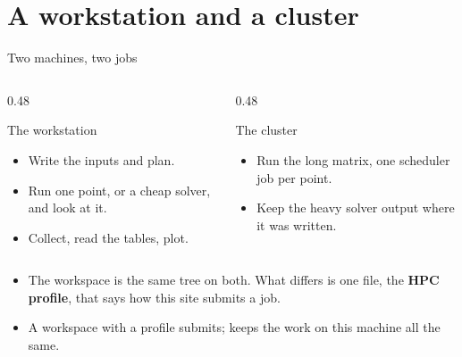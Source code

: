 %
%

\section{A workstation and a cluster}

\begin{frame}{Two machines, two jobs}
\begin{columns}[T]
\begin{column}{0.48\textwidth}
\begin{block}{The workstation}
\begin{itemize}\small
  \item Write the inputs and plan.
  \item Run one point, or a cheap solver, and look at it.
  \item Collect, read the tables, plot.
\end{itemize}
\end{block}
\end{column}
\begin{column}{0.48\textwidth}
\begin{block}{The cluster}
\begin{itemize}\small
  \item Run the long matrix, one scheduler job per point.
  \item Keep the heavy solver output where it was written.
\end{itemize}
\end{block}
\end{column}
\end{columns}
\begin{itemize}
  \item The workspace is the same tree on both. What differs is one file,
        the \textbf{HPC profile}, that says how this site submits a job.
  \item A workspace with a profile submits;  keeps the work on
        this machine all the same.
\end{itemize}
\end{frame}

